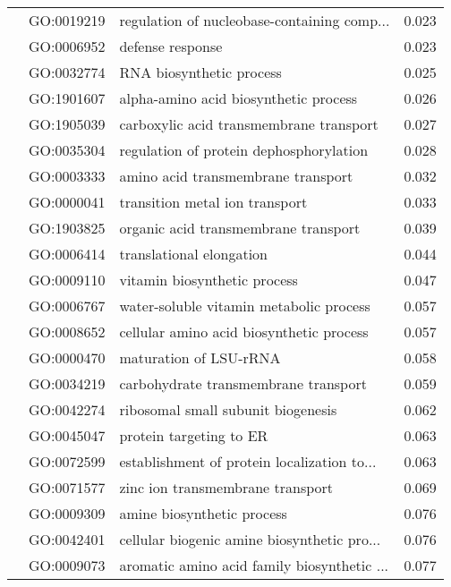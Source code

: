\begin{longtable}{lllr}
   & GO:0019219 &  regulation of nucleobase-containing comp... &         0.023 \\
   & GO:0006952 &                             defense response &         0.023 \\
   & GO:0032774 &                     RNA biosynthetic process &         0.025 \\
   & GO:1901607 &        alpha-amino acid biosynthetic process &         0.026 \\
   & GO:1905039 &      carboxylic acid transmembrane transport &         0.027 \\
   & GO:0035304 &      regulation of protein dephosphorylation &         0.028 \\
   & GO:0003333 &           amino acid transmembrane transport &         0.032 \\
   & GO:0000041 &               transition metal ion transport &         0.033 \\
   & GO:1903825 &         organic acid transmembrane transport &         0.039 \\
   & GO:0006414 &                     translational elongation &         0.044 \\
   & GO:0009110 &                 vitamin biosynthetic process &         0.047 \\
   & GO:0006767 &      water-soluble vitamin metabolic process &         0.057 \\
   & GO:0008652 &     cellular amino acid biosynthetic process &         0.057 \\
   & GO:0000470 &                       maturation of LSU-rRNA &         0.058 \\
   & GO:0034219 &         carbohydrate transmembrane transport &         0.059 \\
   & GO:0042274 &           ribosomal small subunit biogenesis &         0.062 \\
   & GO:0045047 &                      protein targeting to ER &         0.063 \\
   & GO:0072599 &  establishment of protein localization to... &         0.063 \\
   & GO:0071577 &             zinc ion transmembrane transport &         0.069 \\
   & GO:0009309 &                   amine biosynthetic process &         0.076 \\
   & GO:0042401 &  cellular biogenic amine biosynthetic pro... &         0.076 \\
   & GO:0009073 &  aromatic amino acid family biosynthetic ... &         0.077 \\

\end{longtable}
